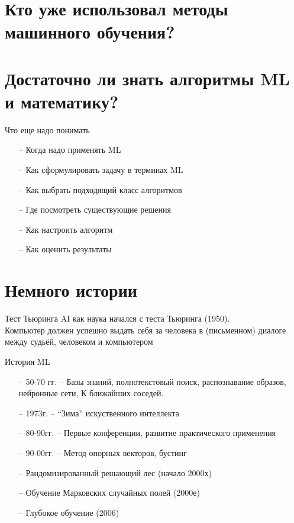 \documentclass[10pt]{beamer}
\begin{document}
\section{Кто уже использовал методы машинного обучения? }

\section{Достаточно ли знать алгоритмы ML и математику?}

\begin{frame}{Что еще надо понимать}
	\begin{itemize}
	  \item[--] Когда надо применять ML
	  \item[--] Как сформулировать задачу в терминах ML
	  \item[--] Как выбрать подходящий класс алгоритмов
	  \item[--] Где посмотреть существующие решения
	  \item[--] Как настроить алгоритм
	  \item[--] Как оценить результаты
	\end{itemize}
\end{frame}

\section{Немного истории}

\begin{frame}{Тест Тьюринга}
    AI как наука начался с теста Тьюринга (1950).\\
    \bigbreak
    Компьютер должен успешно выдать себя за человека в (письменном) диалоге между судьёй, человеком и компьютером
\end{frame}

\begin{frame}{История ML}
	\begin{itemize}
	  \item[--] 50-70 гг. -- Базы знаний, полнотекстовый поиск, распознавание образов, нейронные сети, К ближайших соседей.
	  \item[--] 1973г. -- “Зима” искуственного интеллекта
	  \item[--] 80-90гг.  -- Первые конференции, развитие практического применения
	  \item[--] 90-00гг. -- Метод опорных векторов, бустинг
	  \item[--] Рандомизированный решающий лес (начало 2000х)
	  \item[--] Обучение Марковских случайных полей (2000е)
	  \item[--] Глубокое обучение (2006)
	\end{itemize}
\end{frame}
\end{document}
